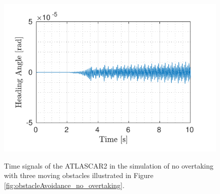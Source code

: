 \begin{figure}[!t]
\begin{minipage}[t]{0.5\textwidth}
		\subcaption{}\label{fig:delta_no_overtaking}
	\end{minipage}
	\begin{minipage}[t]{0.5\textwidth}
		\includegraphics[width=\textwidth]{../../MATLAB/no_overtaking/figure/HeadingAngleVsTime.pdf}
		\subcaption{}\label{fig:theta_no_overtaking}
	\end{minipage}
	\caption{Time signals of the ATLASCAR2 in the simulation of no overtaking with three moving obstacles illustrated in Figure \ref{fig:obstacleAvoidance_no_overtaking}.}
	\label{fig:components_no_overtaking}
\end{figure}


